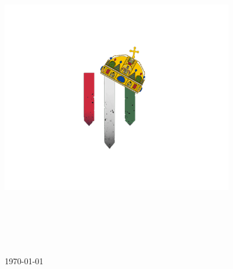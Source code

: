 \hypersetup{pageanchor=false}

\begin{titlepage}
    \begin{center}
        \includegraphics[width=100mm, keepaspectratio]{figures/hll-hun-logo.png}\\
        \vspace{0.3cm}
        \textbf{\hllh}
        
        \vspace{0.4cm}
        {\huge \bfseries \dokumentumcim}\\[0.8cm]
        \vspace{0.5cm}
        \textsc{\Large \hllhdoktipus}\\[4cm]

        \emph{\keszitette}\\
        \szerzoA\\
        \szerzoB    %
        \szerzoC

        \vfill
        {\large \today}
    \end{center}
\end{titlepage}
\hypersetup{pageanchor=false}